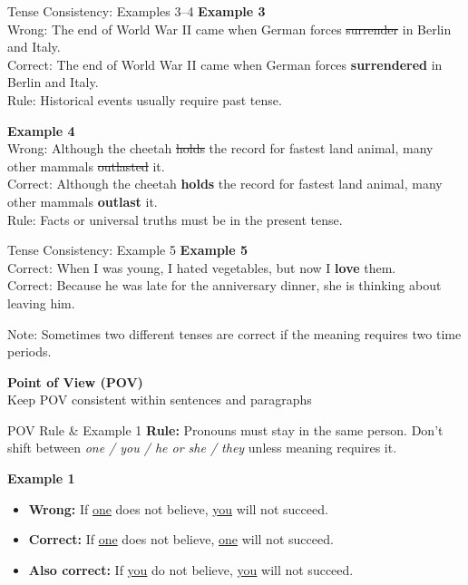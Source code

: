 \documentclass[aspectratio=169,11pt]{beamer}
\begin{document}
\begin{frame}{Tense Consistency: Examples 3–4}
\small
\textbf{Example 3} \\
Wrong: The end of World War II came when German forces \sout{surrender} in Berlin and Italy. \\
Correct: The end of World War II came when German forces \textbf{surrendered} in Berlin and Italy. \\
Rule: Historical events usually require past tense.  

\vspace{0.8em}
\textbf{Example 4} \\
Wrong: Although the cheetah \sout{holds} the record for fastest land animal, many other mammals \sout{outlasted} it. \\
Correct: Although the cheetah \textbf{holds} the record for fastest land animal, many other mammals \textbf{outlast} it. \\
Rule: Facts or universal truths must be in the present tense.
\end{frame}

\begin{frame}{Tense Consistency: Example 5}
\small
\textbf{Example 5} \\
Correct: When I was young, I hated vegetables, but now I \textbf{love} them. \\
Correct: Because he was late for the anniversary dinner, she is thinking about leaving him.  

\vspace{0.5em}
Note: Sometimes two different tenses are correct if the meaning requires two time periods.
\end{frame}

\begin{frame}
  \centering
  \Huge \textbf{Point of View (POV)}\\[1em]
  \Large Keep POV consistent within sentences and paragraphs
\end{frame}

\begin{frame}{POV Rule \& Example 1}
\small
\textbf{Rule:} Pronouns must stay in the same person. Don’t shift between \emph{one / you / he or she / they} unless meaning requires it.

\vspace{0.6em}
\textbf{Example 1}
\begin{itemize}
  \item \textbf{Wrong:} If \underline{one} does not believe, \underline{you} will not succeed.
  \item \textbf{Correct:} If \underline{one} does not believe, \underline{one} will not succeed.
  \item \textbf{Also correct:} If \underline{you} do not believe, \underline{you} will not succeed.
\end{itemize}
\end{frame}
\end{document}
